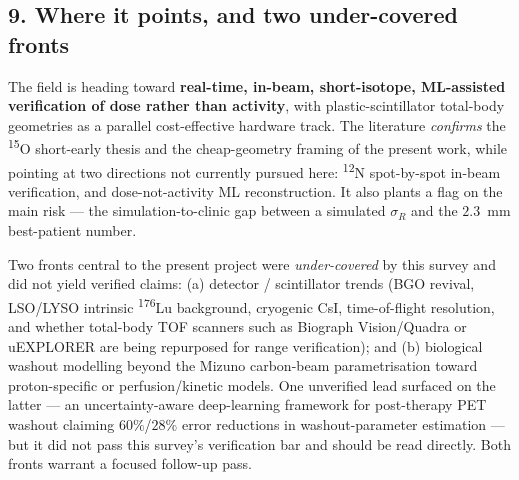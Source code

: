 \documentclass[11pt]{article}
\newcommand{\iso}[2]{\textsuperscript{#1}#2}
\begin{document}
\subsection*{9. Where it points, and two under-covered fronts}

The field is heading toward \textbf{real-time, in-beam, short-isotope,
ML-assisted verification of dose rather than activity}, with plastic-scintillator
total-body geometries as a parallel cost-effective hardware track. The literature
\emph{confirms} the \iso{15}{O} short-early thesis and the cheap-geometry framing
of the present work, while pointing at two directions not currently pursued here:
\iso{12}{N} spot-by-spot in-beam verification, and dose-not-activity ML
reconstruction. It also plants a flag on the main risk --- the simulation-to-clinic
gap between a simulated $\sigma_R$ and the $2.3$~mm best-patient number.

Two fronts central to the present project were \emph{under-covered} by this survey
and did not yield verified claims: (a) detector / scintillator trends (BGO revival,
LSO/LYSO intrinsic \iso{176}{Lu} background, cryogenic CsI, time-of-flight
resolution, and whether total-body TOF scanners such as Biograph Vision/Quadra or
uEXPLORER are being repurposed for range verification); and (b) biological washout
modelling beyond the Mizuno carbon-beam parametrisation toward proton-specific or
perfusion/kinetic models. One unverified lead surfaced on the latter --- an
uncertainty-aware deep-learning framework for post-therapy PET washout claiming
$60\%$/$28\%$ error reductions in washout-parameter estimation \cite{washoutDL2025}
--- but it did not pass this survey's verification bar and should be read directly.
Both fronts warrant a focused follow-up pass.
\end{document}
